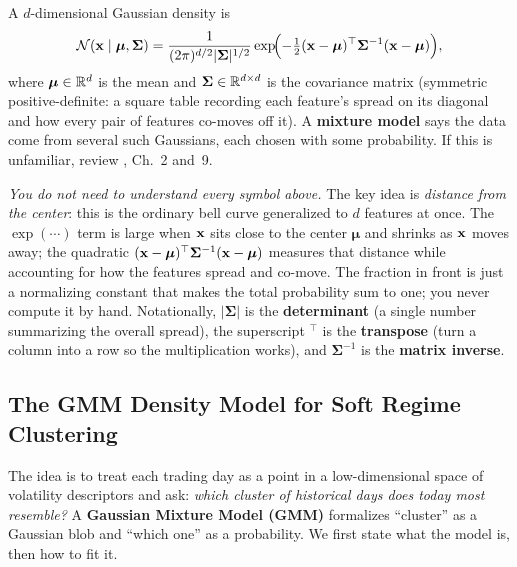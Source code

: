\begin{prereq}
A $d$-dimensional Gaussian density is
\[
  \mathcal{N}(\mathbf{x} \mid \bm{\mu}, \bm{\Sigma})
  = \frac{1}{(2\pi)^{d/2} |\bm{\Sigma}|^{1/2}}
    \exp\!\Bigl(-\tfrac{1}{2}(\mathbf{x} - \bm{\mu})^\top \bm{\Sigma}^{-1}
    (\mathbf{x} - \bm{\mu})\Bigr),
\]
where $\bm{\mu} \in \mathbb{R}^d$ is the mean and
$\bm{\Sigma} \in \mathbb{R}^{d \times d}$ is the covariance matrix (symmetric
positive-definite: a square table recording each feature's spread on
its diagonal and how every pair of features co-moves off it).  A
\textbf{mixture model} says the data come from several such Gaussians,
each chosen with some probability.  If this is unfamiliar, review
\citet{Bishop2006}, Ch.~2 and~9.

\medskip
\textit{You do not need to understand every symbol above.} The key idea is
\emph{distance from the center}: this is the ordinary bell curve
generalized to $d$ features at once. The $\exp(\cdots)$ term is large when
$\mathbf{x}$ sits close to the center $\bm{\mu}$ and shrinks as $\mathbf{x}$ moves away;
the quadratic $(\mathbf{x}-\bm{\mu})^\top \bm{\Sigma}^{-1}(\mathbf{x}-\bm{\mu})$ measures
that distance while accounting for how the features spread and co-move. The
fraction in front is just a normalizing constant that makes the total
probability sum to one; you never compute it by hand. Notationally,
$|\bm{\Sigma}|$ is the \textbf{determinant} (a single number summarizing
the overall spread), the superscript $^\top$ is the \textbf{transpose}
(turn a column into a row so the multiplication works), and
$\bm{\Sigma}^{-1}$ is the \textbf{matrix inverse}.
\end{prereq}

\subsection{The GMM Density Model for Soft Regime Clustering}
\label{sec:hybrid:gmm}

The idea is to treat each trading day as a point in a low-dimensional
space of volatility descriptors and ask: \emph{which cluster of historical
days does today most resemble?}  A \textbf{Gaussian Mixture Model (GMM)}
formalizes ``cluster'' as a Gaussian blob and ``which one'' as a
probability.  We first state what the model is, then how to fit it.

